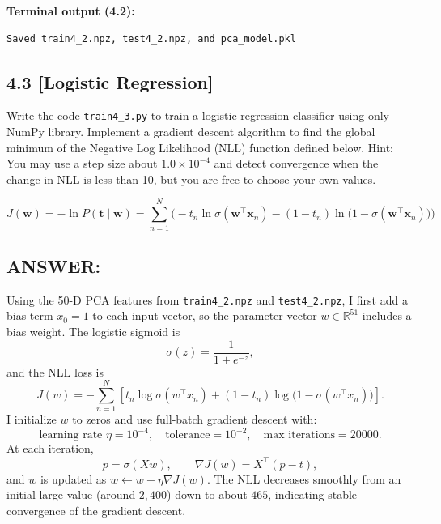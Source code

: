 \documentclass[12pt]{article}
\begin{document}
\textbf{Terminal output (4.2):}
\begin{lstlisting}
Saved train4_2.npz, test4_2.npz, and pca_model.pkl
\end{lstlisting}

\subsection*{4.3 [Logistic Regression]}
Write the code \texttt{train4\_3.py} to train a logistic regression classifier using only NumPy library. Implement a gradient descent algorithm to find the global minimum of the Negative Log Likelihood (NLL) function defined below. Hint: You may use a step size about $1.0 \times 10^{-4}$ and detect convergence when the change in NLL is less than 10, but you are free to choose your own values.

\[
J(\mathbf{w}) = -\ln P(\mathbf{t} \mid \mathbf{w})
= \sum_{n=1}^N \big(
- t_n \ln \sigma(\mathbf{w}^\top \mathbf{x}_n)
- (1 - t_n) \ln\big(1 - \sigma(\mathbf{w}^\top \mathbf{x}_n)\big)
\big)
\]

\subsection*{ANSWER:}
Using the 50-D PCA features from \texttt{train4\_2.npz} and
\texttt{test4\_2.npz}, I first add a bias term $x_0 = 1$ to each input vector,
so the parameter vector $w \in \mathbb{R}^{51}$ includes a bias weight. The
logistic sigmoid is
\[
\sigma(z) = \frac{1}{1 + e^{-z}},
\]
and the NLL loss is
\[
J(w)
=
- \sum_{n=1}^N
\left[
  t_n \log \sigma(w^\top x_n)
  +
  (1 - t_n)\log\bigl(1 - \sigma(w^\top x_n)\bigr)
\right].
\]
I initialize $w$ to zeros and use full-batch gradient descent with:
\[
\text{learning rate } \eta = 10^{-4},\quad
\text{tolerance} = 10^{-2},\quad
\text{max iterations} = 20000.
\]
At each iteration,
\[
p = \sigma(X w),\qquad
\nabla J(w) = X^\top (p - t),
\]
and $w$ is updated as $w \leftarrow w - \eta \nabla J(w)$.
The NLL decreases smoothly from an initial large value (around $2{,}400$) down
to about $465$, indicating stable convergence of the gradient descent.
\end{document}
